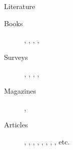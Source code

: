\begin{frame}[c]{Literature}

\begin{description}
\item[Books]
\cite{baral02a},
\cite{gekakasc12a},
\cite{gelkah14a},
\cite{lifschitz19a},
\cite{martru93a}
\item[Surveys]
\cite{lifschitz04a},
\cite{gelfond08a},
\cite{eiiakr09a},
\cite{breitr11a},
\cite{schwol18b}
\item[Magazines]
  \cite{breitr16a},
  \cite{schwol18a}
\item[Articles]
\cite{gellif88b},
\cite{gellif90a},
\cite{bargel94a},
\cite{niemela99a},
\cite{martru99a},
\cite{lifschitz02a},
\cite{gelleo02a},
\cite{gehakalisc15a},
etc.
\nocite{PotasscoUserGuide}
\end{description}


\end{frame}
